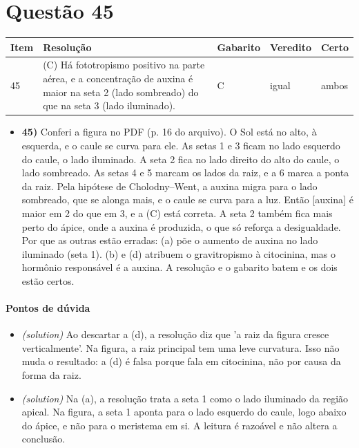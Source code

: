 \documentclass{article}%
\begin{document}
\section*{Questão 45}%
\begin{longtable}{@{}p{} p{} p{} p{} p{}@{}}\toprule Item & Resolução & Gabarito & Veredito & Certo \\ \midrule
45 & (C) Há fototropismo positivo na parte aérea, e a concentração de auxina é maior na seta 2 (lado sombreado) do que na seta 3 (lado iluminado). & C & igual & ambos \\
\bottomrule\end{longtable}%
\begin{itemize}%
\item%
\textbf{45)} Conferi a figura no PDF (p. 16 do arquivo). O Sol está no alto, à esquerda, e o caule se curva para ele. As setas 1 e 3 ficam no lado esquerdo do caule, o lado iluminado. A seta 2 fica no lado direito do alto do caule, o lado sombreado. As setas 4 e 5 marcam os lados da raiz, e a 6 marca a ponta da raiz. Pela hipótese de Cholodny--Went, a auxina migra para o lado sombreado, que se alonga mais, e o caule se curva para a luz. Então {[}auxina{]} é maior em 2 do que em 3, e a (C) está correta. A seta 2 também fica mais perto do ápice, onde a auxina é produzida, o que só reforça a desigualdade. Por que as outras estão erradas: (a) põe o aumento de auxina no lado iluminado (seta 1). (b) e (d) atribuem o gravitropismo à citocinina, mas o hormônio responsável é a auxina. A resolução e o gabarito batem e os dois estão certos.%
\end{itemize}%
\paragraph{Pontos de dúvida}%
\begin{itemize}%
\item%
\textit{(solution)} Ao descartar a (d), a resolução diz que 'a raiz da figura cresce verticalmente'. Na figura, a raiz principal tem uma leve curvatura. Isso não muda o resultado: a (d) é falsa porque fala em citocinina, não por causa da forma da raiz.%
\item%
\textit{(solution)} Na (a), a resolução trata a seta 1 como o lado iluminado da região apical. Na figura, a seta 1 aponta para o lado esquerdo do caule, logo abaixo do ápice, e não para o meristema em si. A leitura é razoável e não altera a conclusão.%
\end{itemize}%
\end{document}
